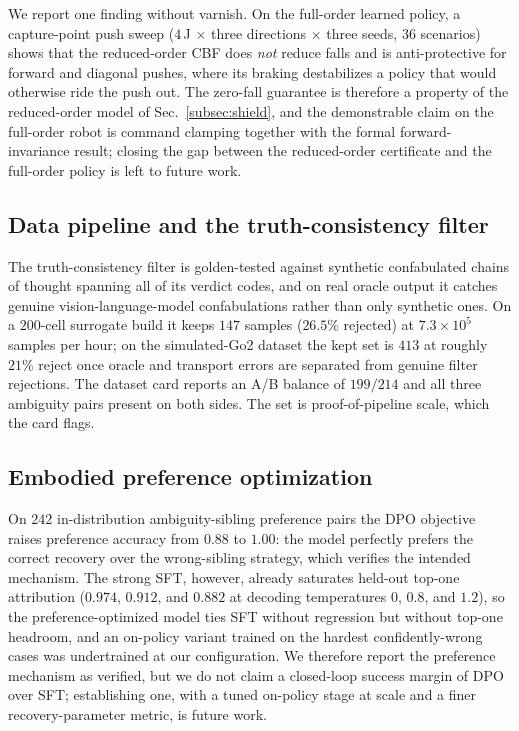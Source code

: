 \documentclass[conference]{IEEEtran}
\begin{document}
We report one finding without varnish. On the full-order learned policy, a
capture-point push sweep ($4$\,J $\times$ three directions $\times$ three seeds,
$36$ scenarios) shows that the reduced-order CBF does \emph{not} reduce falls and is
anti-protective for forward and diagonal pushes, where its braking destabilizes a
policy that would otherwise ride the push out. The zero-fall guarantee is therefore
a property of the reduced-order model of Sec.~\ref{subsec:shield}, and the
demonstrable claim on the full-order robot is command clamping together with the
formal forward-invariance result; closing the gap between the reduced-order
certificate and the full-order policy is left to future work.

\subsection{Data pipeline and the truth-consistency filter}
The truth-consistency filter is golden-tested against synthetic confabulated chains
of thought spanning all of its verdict codes, and on real oracle output it catches
genuine vision-language-model confabulations rather than only synthetic ones. On a
$200$-cell surrogate build it keeps $147$ samples ($26.5\%$ rejected) at
$7.3\times10^{5}$ samples per hour; on the simulated-Go2 dataset the kept set is
$413$ at roughly $21\%$ reject once oracle and transport errors are separated from
genuine filter rejections. The dataset card reports an A/B balance of $199/214$ and
all three ambiguity pairs present on both sides. The set is proof-of-pipeline scale,
which the card flags.

\subsection{Embodied preference optimization}
On $242$ in-distribution ambiguity-sibling preference pairs the DPO objective raises
preference accuracy from $0.88$ to $1.00$: the model perfectly prefers the correct
recovery over the wrong-sibling strategy, which verifies the intended mechanism.
The strong SFT, however, already saturates held-out top-one attribution
($0.974$, $0.912$, and $0.882$ at decoding temperatures $0$, $0.8$, and $1.2$), so
the preference-optimized model ties SFT without regression but without top-one
headroom, and an on-policy variant trained on the hardest confidently-wrong cases
was undertrained at our configuration. We therefore report the preference mechanism
as verified, but we do not claim a closed-loop success margin of DPO over SFT;
establishing one, with a tuned on-policy stage at scale and a finer
recovery-parameter metric, is future work.
\end{document}
